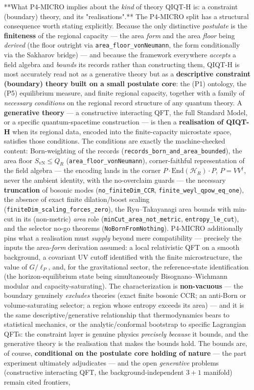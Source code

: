 \documentclass[11pt,a4paper]{article}
\begin{document}
**What P4-MICRO implies about the \emph{kind} of theory QIQT-H is: a constraint (boundary) theory, and its "realisations".** The P4-MICRO split has a structural consequence worth stating explicitly. Because the only distinctive \emph{postulate} is the \textbf{finiteness} of the regional capacity — the area \emph{form} and the area \emph{floor} being \emph{derived} (the floor outright via \texttt{area\_floor\_vonNeumann}, the form conditionally via the Sakharov bridge) — and because the framework everywhere \emph{accepts} a field algebra and \emph{bounds} its records rather than constructing them, QIQT-H is most accurately read not as a generative theory but as a \textbf{descriptive constraint (boundary) theory built on a small postulate core}: the (P1) ontology, the (P5) equilibrium measure, and finite regional capacity, together with a family of \emph{necessary conditions} on the regional record structure of any quantum theory. A \textbf{generative theory} — a constructive interacting QFT, the full Standard Model, or a specific quantum-spacetime construction — is then a \textbf{realisation of QIQT-H} when its regional data, encoded into the finite-capacity microstate space, satisfies those conditions. The conditions are exactly the machine-checked content: Born-weighting of the records (\texttt{records\_born\_and\_area\_bounded}), the area floor $S_{\mathrm{vN}}\le Q_R$ (\texttt{area\_floor\_vonNeumann}), corner-faithful representation of the field algebra — the encoding lands in the corner $P\cdot\mathrm{End}(\mathcal{H}_R)\cdot P$, $P=VV^\dagger$, never the ambient identity, with the no-overclaim guards — the necessary \textbf{truncation} of bosonic modes (\texttt{no\_finiteDim\_CCR}, \texttt{finite\_weyl\_qpow\_eq\_one}), the absence of exact finite dilation/boost scaling (\texttt{finiteDim\_scaling\_forces\_zero}), the Ryu–Takayanagi area bounds with min-cut in its (non-metric) \emph{area} role (\texttt{minCut\_area\_not\_metric}, \texttt{entropy\_le\_cut}), and the selector no-go theorems (\texttt{NoBornFromNothing}). P4-MICRO additionally pins what a realisation must \emph{supply} beyond mere compatibility — precisely the inputs the area-\emph{form} derivation assumed: a local relativistic QFT on a smooth background, a covariant UV cutoff identified with the finite microstructure, the value of $G/\ell_P$, and, for the gravitational sector, the reference-state identification (the horizon-equilibrium state being simultaneously Bisognano–Wichmann modular and capacity-saturating). The characterization is \textbf{non-vacuous} — the boundary genuinely \emph{excludes} theories (exact finite bosonic CCR; an anti-Born or volume-saturating selector; a region whose entropy exceeds its area) — and it is the same descriptive/generative relationship that thermodynamics bears to statistical mechanics, or the analytic/conformal bootstrap to specific Lagrangian QFTs: the constraint layer is genuine physics \emph{precisely because} it bounds, and the generative theory is the realisation that makes the bounds hold. The bounds are, of course, \textbf{conditional on the postulate core holding of nature} — the part experiment ultimately adjudicates — and the open \emph{generative} problems (constructive interacting QFT, the background-independent $3{+}1$ manifold) remain cited frontiers, 
\end{document}
